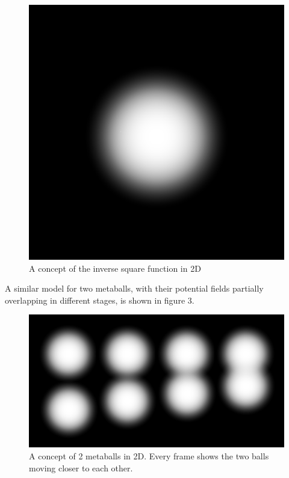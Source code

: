 \documentclass{article}
\begin{document}
            \begin{figure}[ht]
                \includegraphics[width=\linewidth]{img/2d-potential.png}
                \caption{A concept of the inverse square function in 2D}
                \label{fig:2d-potential}
            \end{figure}

            A similar model for two metaballs, with their potential fields partially overlapping in different stages, is shown in figure 3.
            
            \begin{figure}[ht]
                \includegraphics[width=\linewidth]{img/2d-potential-multi.png}
                \caption{A concept of 2 metaballs in 2D. Every frame shows the two balls moving closer to each other.}
                \label{fig:2d-potential-multi}
            \end{figure}
\end{document}
